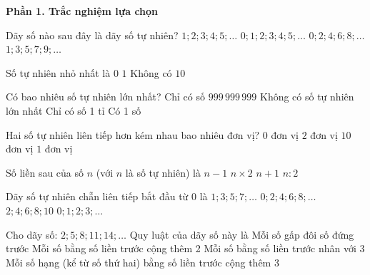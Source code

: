 \textbf{Phần 1. Trắc nghiệm lựa chọn}

\begin{ex} %
Dãy số nào sau đây là dãy số tự nhiên?
\choice
{$1; 2; 3; 4; 5; \dots$}
{\True $0; 1; 2; 3; 4; 5; \dots$}
{$0; 2; 4; 6; 8; \dots$}
{$1; 3; 5; 7; 9; \dots$}
\end{ex}

\begin{ex} %
Số tự nhiên nhỏ nhất là
\choice
{\True $0$}
{$1$}
{Không có}
{$10$}
\end{ex}

\begin{ex} %
Có bao nhiêu số tự nhiên lớn nhất?
\choice
{Chỉ có số $999\,999\,999$}
{\True Không có số tự nhiên lớn nhất}
{Chỉ có số 1 tỉ}
{Có 1 số}
\end{ex}

\begin{ex} %
Hai số tự nhiên liên tiếp hơn kém nhau bao nhiêu đơn vị?
\choice
{$0$ đơn vị}
{$2$ đơn vị}
{$10$ đơn vị}
{\True $1$ đơn vị}
\end{ex}

\begin{ex} %
Số liền sau của số $n$ (với $n$ là số tự nhiên) là
\choice
{$n - 1$}
{$n \times 2$}
{\True $n + 1$}
{$n : 2$}
\end{ex}

\begin{ex} %
Dãy số tự nhiên chẵn liên tiếp bắt đầu từ 0 là
\choice
{$1; 3; 5; 7; \dots$}
{\True $0; 2; 4; 6; 8; \dots$}
{$2; 4; 6; 8; 10$}
{$0; 1; 2; 3; \dots$}
\end{ex}

\begin{ex} %
Cho dãy số: $2; 5; 8; 11; 14; \dots$ Quy luật của dãy số này là
\choice
{Mỗi số gấp đôi số đứng trước}
{Mỗi số bằng số liền trước cộng thêm 2}
{Mỗi số bằng số liền trước nhân với 3}
{\True Mỗi số hạng (kể từ số thứ hai) bằng số liền trước cộng thêm 3}
\end{ex}

